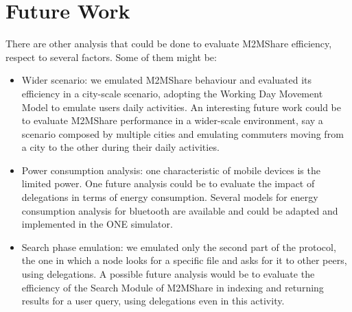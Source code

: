 \pagebreak
\section{Future Work}
There are other analysis that could be done to evaluate M2MShare efficiency, respect to several factors. Some of them might be:
\begin{itemize}
\item Wider scenario: we emulated M2MShare behaviour and evaluated its efficiency in a city-scale scenario, adopting the Working Day Movement Model to emulate users daily activities. An interesting future work could be to evaluate M2MShare performance in a wider-scale environment, say a scenario composed by multiple cities and emulating commuters moving from a city to the other during their daily activities.
\item Power consumption analysis: one characteristic of mobile devices is the limited power. One future analysis could be to evaluate the impact of delegations in terms of energy consumption. Several models for  energy consumption analysis for bluetooth are available and could be adapted and implemented in the ONE simulator.
\item Search phase emulation: we emulated only the second part of the protocol, the one in which a node looks for a specific file and asks for it to other peers, using delegations. A possible future analysis would be to evaluate the efficiency of the Search Module of M2MShare in indexing and returning results for a user query, using delegations even in this activity.
\end{itemize}

 


